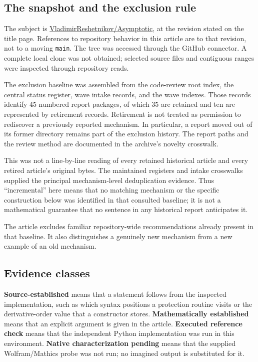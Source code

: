 \documentclass[11pt,a4paper]{article}
\newcommand{\code}[1]{\nolinkurl{#1}}
\begin{document}
\subsection{The snapshot and the exclusion rule}
The subject is \href{https://github.com/VladimirReshetnikov/Asymptotic}{VladimirReshetnikov/Asymptotic}, at the revision stated on the title page. References to repository behavior in this article are to that revision, not to a moving \code{main}. The tree was accessed through the GitHub connector. A complete local clone was not obtained; selected source files and contiguous ranges were inspected through repository reads.

The exclusion baseline was assembled from the code-review root index, the central status register, wave intake records, and the wave indexes. Those records identify 45 numbered report packages, of which 35 are retained and ten are represented by retirement records. Retirement is not treated as permission to rediscover a previously reported mechanism. In particular, a report moved out of its former directory remains part of the exclusion history. The report paths and the review method are documented in the archive's novelty crosswalk.\cite{reviewindex,status,wave3,wave4,wave5}

This was not a line-by-line reading of every retained historical article and every retired article's original bytes. The maintained registers and intake crosswalks supplied the principal mechanism-level deduplication evidence. Thus ``incremental'' here means that no matching mechanism or the specific construction below was identified in that consulted baseline; it is not a mathematical guarantee that no sentence in any historical report anticipates it.

The article excludes familiar repository-wide recommendations already present in that baseline. It also distinguishes a genuinely new mechanism from a new example of an old mechanism.

\subsection{Evidence classes}
\textbf{Source-established} means that a statement follows from the inspected implementation, such as which syntax positions a protection routine visits or the derivative-order value that a constructor stores. \textbf{Mathematically established} means that an explicit argument is given in the article. \textbf{Executed reference check} means that the independent Python implementation was run in this environment. \textbf{Native characterization pending} means that the supplied Wolfram/Mathics probe was not run; no imagined output is substituted for it.
\end{document}
